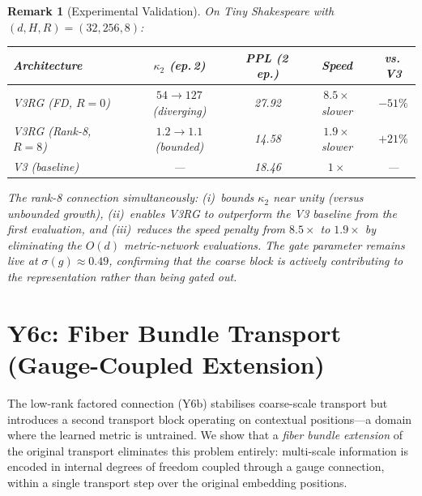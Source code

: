 \documentclass[11pt,letterpaper]{article}
\newtheorem{remark}[conjecture]{Remark}
\begin{document}
\begin{remark}[Experimental 
Validation]\label{rem:lowrank_experiment}
On Tiny Shakespeare with $(d, H, R) = (32, 256, 8)$:

\medskip
\begin{center}
\begin{tabular}{lcccc}
\toprule
\textbf{Architecture} & \textbf{$\kappa_2$ (ep.\,2)} 
& \textbf{PPL (2\,ep.)} & \textbf{Speed} & \textbf{vs.\,V3} \\
\midrule
V3RG (FD, $R{=}0$) & $54 \to 127$ (diverging) & 27.92 & 
$8.5\times$ slower & $-51\%$ \\
V3RG (Rank-8, $R{=}8$) & $1.2 \to 1.1$ (bounded) & 14.58 & 
$1.9\times$ slower & $+21\%$ \\
V3 (baseline) & --- & 18.46 & $1\times$ & --- \\
\bottomrule
\end{tabular}
\end{center}

\medskip\noindent
The rank-8 connection simultaneously: (i)~bounds $\kappa_2$ near 
unity (versus unbounded growth), (ii)~enables V3RG to outperform 
the V3 baseline from the first evaluation, and 
(iii)~reduces the speed penalty from $8.5\times$ to $1.9\times$ by 
eliminating the $O(d)$ metric-network evaluations. The gate 
parameter remains live at $\sigma(g) \approx 0.49$, confirming 
that the coarse block is actively contributing to the 
representation rather than being gated out.
\end{remark}

\section{Y6c: Fiber Bundle Transport (Gauge-Coupled Extension)}

The low-rank factored connection (Y6b) stabilises coarse-scale 
transport but introduces a second transport block operating on 
contextual positions---a domain where the learned metric is 
untrained. We show that a \emph{fiber bundle extension} of the 
original transport eliminates this problem entirely: multi-scale 
information is encoded in internal degrees of freedom coupled 
through a gauge connection, within a single transport step over the 
original embedding positions.
\end{document}
